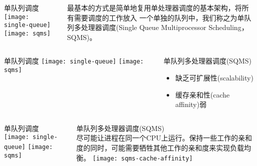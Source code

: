 \begin{frame}
	\begin{columns}
	\begin{column}{.5\textwidth}
	\Large \centering
	单队列调度
    \texttt{[image: single-queue]}
	\texttt{[image: sqms]}	
	\end{column}
	
	\begin{column}{.5\textwidth}
		\large
		最基本的方式是简单地复用单处理器调度的基本架构，将所有需要调度的工作放入 一个单独的队列中，我们称之为单队列多处理器调度(Single Queue Multiprocessor Scheduling，SQMS)。

		
	\end{column}
\end{columns}
\end{frame}
\begin{frame}
	\begin{columns}
		\begin{column}{.5\textwidth}
			\Large \centering
			单队列调度
			\texttt{[image: single-queue]}
			\texttt{[image: sqms]}	
		\end{column}
		
		\begin{column}{.5\textwidth}
			\large
			单队列多处理器调度(SQMS)
			

			\begin{itemize}\large
				\item 缺乏可扩展性(scalability)
				\item 缓存亲和性(cache affinity)弱
			\end{itemize}
			
		\end{column}
	\end{columns}
\end{frame}


\begin{frame}
	\begin{columns}
		\begin{column}{.5\textwidth}
			\Large \centering
			单队列调度
			\texttt{[image: single-queue]}
			\texttt{[image: sqms]}	
		\end{column}
		
		\begin{column}{.5\textwidth}
			\large
			单队列多处理器调度(SQMS) \\
			\normalsize
			尽可能让进程在同一个CPU上运行。保持一些工作的亲和度的同时，可能需要牺牲其他工作的亲和度来实现负载均衡。
			\texttt{[image: sqms-cache-affinity]}

			
		\end{column}
	\end{columns}
\end{frame}

